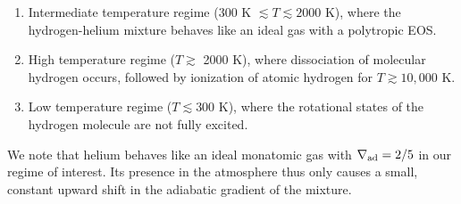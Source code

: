 \documentclass[apj]{emulateapj}
\newcommand{\delad}{\nabla_{\rm ad}}
\begin{document}

\begin{enumerate}
\item Intermediate temperature regime (300 K $\lesssim T \lesssim 2000$ K), where the hydrogen-helium mixture behaves like an ideal gas with a polytropic EOS.
\item High temperature regime ($T \gtrsim$ 2000 K), where dissociation of molecular hydrogen occurs, followed by ionization of atomic hydrogen for $T \gtrsim 10,000$ K.
\item Low temperature regime ($T \lesssim 300$ K), where the rotational states of the hydrogen molecule are not fully excited. %
\end{enumerate}

We note that helium behaves like an ideal monatomic gas with $\delad=2/5$ in our regime of interest.  Its presence in the atmosphere thus only causes a small, constant upward shift in the adiabatic gradient of the mixture.
\end{document}
